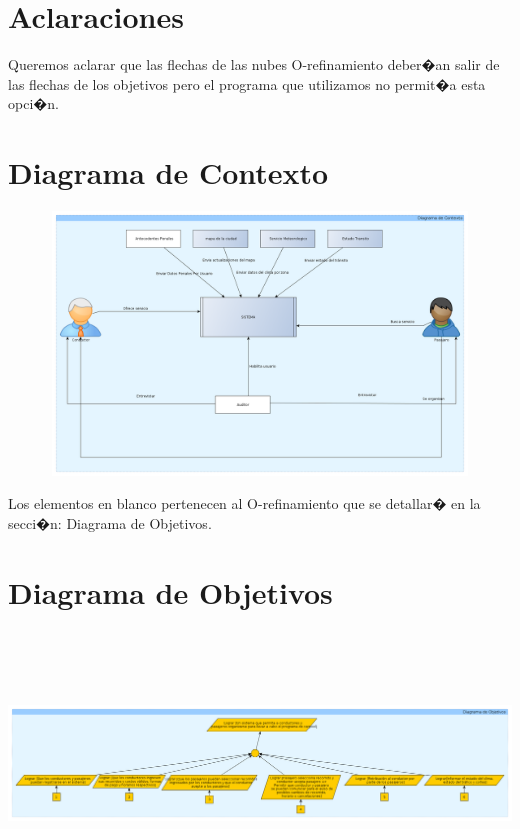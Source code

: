 \documentclass[a4paper,titlepage,10pt]{article}
\begin{document}
 

\maketitle

\section{Aclaraciones} %
Queremos aclarar que las flechas de las nubes O-refinamiento deber�an salir de las flechas de los objetivos pero el programa que utilizamos no permit�a esta opci�n.

\section{Diagrama de Contexto} %

\includegraphics[height=7cm,width=17cm]{imagenes/contexto.png}

Los elementos en blanco pertenecen al O-refinamiento que se detallar� en la secci�n: Diagrama de Objetivos.

\newpage

\section{Diagrama de Objetivos} %

\includegraphics[height=7cm,width=19.5cm]{imagenes/root.png}
\end{document}
